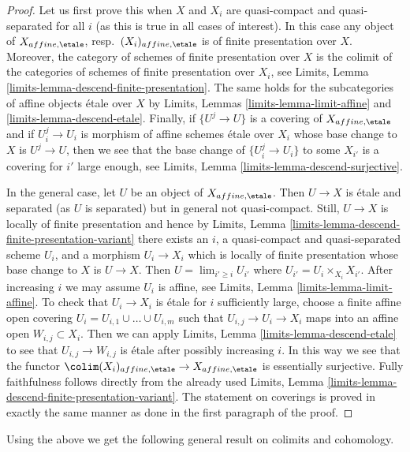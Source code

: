 \begin{proof}
Let us first prove this when $X$ and $X_i$ are quasi-compact and
quasi-separated for all $i$ (as this is true in all cases of
interest). In this case any object of
$X_{affine, \etale}$, resp.\ $(X_i)_{affine, \etale}$ is
of finite presentation over $X$. Moreover, the
category of schemes of finite presentation over $X$ is the
colimit of the categories of schemes of finite presentation
over $X_i$, see
Limits, Lemma \ref{limits-lemma-descend-finite-presentation}.
The same holds for the subcategories of affine objects \'etale
over $X$ by Limits, Lemmas
\ref{limits-lemma-limit-affine} and \ref{limits-lemma-descend-etale}.
Finally, if $\{U^j \to U\}$ is a covering of $X_{affine, \etale}$
and if $U_i^j \to U_i$ is morphism of affine schemes \'etale over
$X_i$ whose base change to $X$ is $U^j \to U$, then we see that
the base change of $\{U^j_i \to U_i\}$ to some $X_{i'}$ is
a covering for $i'$ large enough, see
Limits, Lemma \ref{limits-lemma-descend-surjective}.

\medskip\noindent
In the general case, let $U$ be an object of $X_{affine, \etale}$.
Then $U \to X$ is \'etale and separated (as $U$ is separated)
but in general not quasi-compact. Still, $U \to X$ is locally
of finite presentation and hence by
Limits, Lemma \ref{limits-lemma-descend-finite-presentation-variant}
there exists an $i$, a quasi-compact and quasi-separated scheme $U_i$, and
a morphism $U_i \to X_i$ which is locally of finite presentation
whose base change to $X$ is $U \to X$. Then $U = \lim_{i' \geq i} U_{i'}$
where $U_{i'} = U_i \times_{X_i} X_{i'}$.
After increasing $i$ we may assume $U_i$ is affine, see
Limits, Lemma \ref{limits-lemma-limit-affine}.
To check that $U_i \to X_i$ is \'etale for $i$ sufficiently large,
choose a finite affine open covering $U_i = U_{i, 1} \cup \ldots \cup U_{i, m}$
such that $U_{i, j} \to U_i \to X_i$ maps into an affine open
$W_{i, j} \subset X_i$. Then we can apply
Limits, Lemma \ref{limits-lemma-descend-etale}
to see that $U_{i, j} \to W_{i, j}$ is \'etale
after possibly increasing $i$.
In this way we see that the functor
$\colim (X_i)_{affine, \etale} \to X_{affine, \etale}$
is essentially surjective. Fully faithfulness follows
directly from the already used
Limits, Lemma \ref{limits-lemma-descend-finite-presentation-variant}.
The statement on coverings is proved in exactly the same
manner as done in the first paragraph of the proof.
\end{proof}

\noindent
Using the above we get the following general result on colimits and cohomology.

